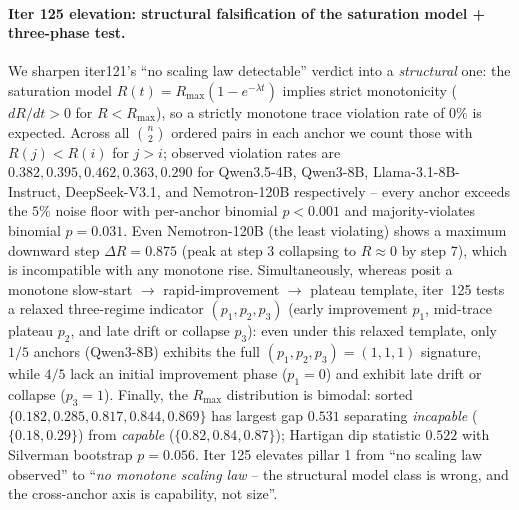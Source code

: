 \paragraph{Iter 125 elevation: structural falsification of the saturation model + three-phase test.}
\label{par:scaling-iter125}
We sharpen iter121's ``no scaling law detectable'' verdict into a
\emph{structural} one: the saturation model
$R(t) = R_{\max}(1 - e^{-\lambda t})$ implies strict monotonicity
($dR/dt > 0$ for $R < R_{\max}$), so a strictly monotone trace
violation rate of $0\%$ is expected.  Across all $\binom{n}{2}$
ordered pairs in each anchor we count those with $R(j) < R(i)$
for $j > i$; observed violation rates are $0.382, 0.395, 0.462,
0.363, 0.290$ for Qwen3.5-4B, Qwen3-8B, Llama-3.1-8B-Instruct,
DeepSeek-V3.1, and Nemotron-120B respectively -- every anchor
exceeds the $5\%$ noise floor with per-anchor binomial $p < 0.001$
and majority-violates binomial $p = 0.031$.  Even Nemotron-120B
(the least violating) shows a maximum downward step
$\Delta R = 0.875$ (peak at step 3 collapsing to $R \approx 0$
by step 7), which is incompatible with any monotone rise.
Simultaneously, whereas \citet{nimmaturi2025predictive} posit a
monotone slow-start $\to$ rapid-improvement $\to$ plateau template,
iter~125 tests a relaxed three-regime indicator $(p_1, p_2, p_3)$
(early improvement $p_1$, mid-trace plateau $p_2$, and late drift or
collapse $p_3$): even under this relaxed template, only $1/5$
anchors (Qwen3-8B) exhibits the full $(p_1, p_2, p_3) = (1, 1, 1)$
signature, while $4/5$ lack an initial improvement phase ($p_1 = 0$)
and exhibit late drift or collapse ($p_3 = 1$).  Finally, the
$R_{\max}$ distribution is bimodal:
sorted $\{0.182, 0.285, 0.817, 0.844, 0.869\}$ has largest gap
$0.531$ separating \emph{incapable} ($\{0.18, 0.29\}$) from
\emph{capable} ($\{0.82, 0.84, 0.87\}$); Hartigan dip statistic
$0.522$ with Silverman bootstrap $p = 0.056$.  Iter 125
elevates pillar 1 from ``no scaling law observed'' to ``\emph{no
monotone scaling law} -- the structural model class is wrong,
and the cross-anchor axis is capability, not size''.

